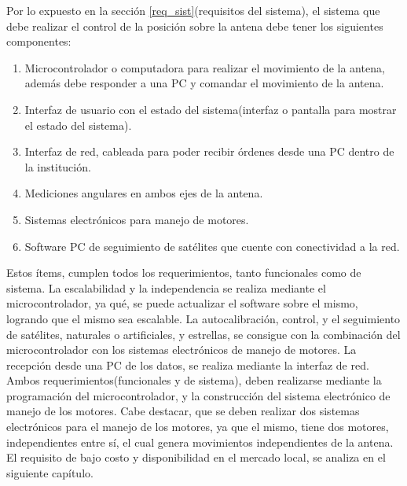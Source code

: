 Por lo expuesto en la sección \ref{req_sist}(requisitos del sistema), el sistema que debe realizar el control de la posición sobre la antena debe tener los siguientes componentes: 

\begin{enumerate}
	\item Microcontrolador o computadora para realizar el movimiento de la antena, además debe responder a una PC y comandar el movimiento de la antena.    
	\item Interfaz de usuario con el estado del sistema(interfaz o pantalla para mostrar el estado del sistema).
	\item Interfaz de red, cableada para poder recibir órdenes desde una PC dentro de la institución. 
	\item Mediciones angulares en ambos ejes de la antena.  
	\item Sistemas electrónicos para manejo de motores. 
	\item Software PC de seguimiento de satélites que cuente con conectividad a la red.  
\end{enumerate}

Estos ítems, cumplen todos los requerimientos, tanto funcionales como de sistema. La escalabilidad y la independencia se realiza mediante el microcontrolador, ya qué, se puede actualizar el software sobre el mismo, logrando que el mismo sea escalable. La autocalibración, 
control, y el seguimiento de satélites, naturales o artificiales, y estrellas, se consigue con la combinación del microcontrolador con los sistemas electrónicos de manejo de motores. La recepción desde una PC de los datos, se realiza mediante la interfaz de red. Ambos requerimientos(funcionales y de sistema), deben realizarse mediante la programación del microcontrolador, y la construcción del sistema electrónico de manejo de los motores. Cabe destacar, que se deben realizar dos sistemas electrónicos para el manejo de los motores, ya que el mismo, tiene dos motores, independientes entre sí, el cual genera movimientos independientes de la antena. El requisito de bajo costo y disponibilidad en el mercado local, se analiza en el siguiente capítulo. 


